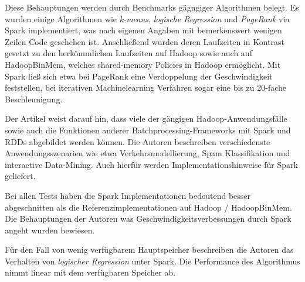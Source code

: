 Diese Behauptungen werden durch Benchmarks gägngiger Algorithmen belegt. Es wurden einige Algorithmen wie \textit{k-means}, \textit{logische Regression} und \textit{PageRank} via Spark implementiert, was nach eigenen Angaben mit bemerkenswert wenigen Zeilen Code geschehen ist. Anschließend wurden deren Laufzeiten in Kontrast gesetzt zu den herkömmlichen Laufzeiten auf Hadoop sowie auch auf HadoopBinMem, welches shared-memory Policies in Hadoop ermöglicht. Mit Spark ließ sich etwa bei PageRank eine Verdoppelung der Geschwindigkeit feststellen, bei iterativen Machinelearning Verfahren sogar eine bis zu 20-fache Beschleunigung.

Der Artikel weist darauf hin, dass viele der gängigen Hadoop-Anwendungsfälle sowie auch die Funktionen anderer Batchprocessing-Frameworks mit Spark und RDDs abgebildet werden können. Die Autoren beschreiben verschiedenste Anwendungsszenarien wie etwa Verkehrsmodellierung, Spam Klassifikation und interactive Data-Mining. Auch hierfür werden Implementationshinweise für Spark geliefert.

Bei allen Tests haben die Spark Implementationen bedeutend besser abgeschnitten als die Referenzimplementationen auf Hadoop / HadoopBinMem. Die Behauptungen der Autoren was Geschwindigkeitsverbessungen durch Spark angeht wurden bewiesen.

Für den Fall von wenig verfügbarem Hauptspeicher beschreiben die Autoren das Verhalten von \textit{logischer Regression} unter Spark. Die Performance des Algorithmus nimmt linear mit dem verfügbaren Speicher ab.